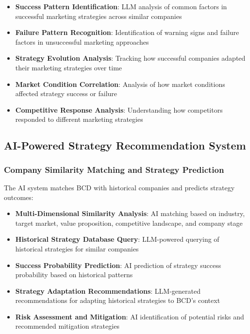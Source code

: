 \begin{itemize}
    \item \textbf{Success Pattern Identification}: LLM analysis of common factors in successful marketing strategies across similar companies
    \item \textbf{Failure Pattern Recognition}: Identification of warning signs and failure factors in unsuccessful marketing approaches
    \item \textbf{Strategy Evolution Analysis}: Tracking how successful companies adapted their marketing strategies over time
    \item \textbf{Market Condition Correlation}: Analysis of how market conditions affected strategy success or failure
    \item \textbf{Competitive Response Analysis}: Understanding how competitors responded to different marketing strategies
\end{itemize}

\subsection{AI-Powered Strategy Recommendation System}

\subsubsection{Company Similarity Matching and Strategy Prediction}

The AI system matches BCD with historical companies and predicts strategy outcomes:

\begin{itemize}
    \item \textbf{Multi-Dimensional Similarity Analysis}: AI matching based on industry, target market, value proposition, competitive landscape, and company stage
    \item \textbf{Historical Strategy Database Query}: LLM-powered querying of historical strategies for similar companies
    \item \textbf{Success Probability Prediction}: AI prediction of strategy success probability based on historical patterns
    \item \textbf{Strategy Adaptation Recommendations}: LLM-generated recommendations for adapting historical strategies to BCD's context
    \item \textbf{Risk Assessment and Mitigation}: AI identification of potential risks and recommended mitigation strategies
\end{itemize}

